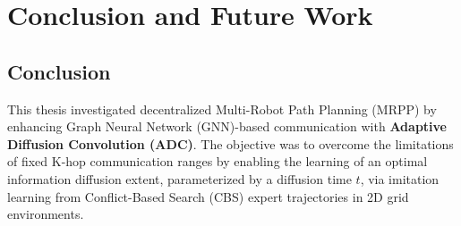 \chapter{Conclusion and Future Work}
\label{chap:conclusion}

\section{Conclusion}
This thesis investigated decentralized Multi-Robot Path Planning (MRPP) by enhancing Graph Neural Network (GNN)-based communication with \textbf{Adaptive Diffusion Convolution (ADC)}. The objective was to overcome the limitations of fixed K-hop communication ranges by enabling the learning of an optimal information diffusion extent, parameterized by a diffusion time $t$, via imitation learning from Conflict-Based Search (CBS) expert trajectories in 2D grid environments.

